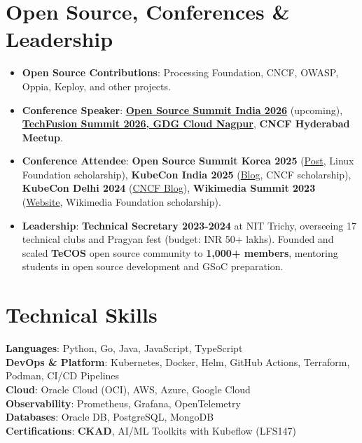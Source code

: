 \documentclass[letterpaper,11pt]{article}
\newcommand{\resumeItem}[1]{
  \item\small{
    {#1 \vspace{-4pt}}
  }
}
\newcommand{\resumeItemListStart}{\begin{itemize}}
\newcommand{\resumeItemListEnd}{\end{itemize}\vspace{-5pt}}
\begin{document}
\section{Open Source, Conferences \& Leadership}
    \resumeItemListStart
    \resumeItem{
        \textbf{Open Source Contributions}: Processing Foundation, CNCF, OWASP, Oppia, Keploy, and other projects.
    }
    \resumeItem{
    \textbf{Conference Speaker}: 
    \href{https://ossindia2026.sched.com/event/2KNF7}{\textbf{Open Source Summit India 2026}} (upcoming),
    \href{https://gdg.community.dev/events/details/google-gdg-cloud-nagpur-presents-techfusion-summit-2026/}{\textbf{TechFusion Summit 2026, GDG Cloud Nagpur}},
    \textbf{CNCF Hyderabad Meetup}.
    }
    \resumeItem{
    \textbf{Conference Attendee}: 
    \textbf{Open Source Summit Korea 2025} (\href{https://www.linkedin.com/posts/akashjaiswal03_opensourcesummit-openssf-opensearchcon-ugcPost-7392580382480658433-a8-J}{Post}, Linux Foundation scholarship), 
    \textbf{KubeCon India 2025} (\href{https://blog.kubeflow.org/kubecon/community/2025/08/23/kubecon-2025-india-kubeflow.html}{Blog}, CNCF scholarship),
    \textbf{KubeCon Delhi 2024} (\href{https://www.cncf.io/blog/2025/03/17/kubecon-cloudnativecon-india-2024-from-dreams-to-reality-journey/}{CNCF Blog}), 
    \textbf{Wikimedia Summit 2023} (\href{https://indicwiki.iiit.ac.in/summit-2023/}{Website}, Wikimedia Foundation scholarship).
    }
    \resumeItem{\textbf{Leadership}: \textbf{Technical Secretary 2023-2024} at NIT Trichy, overseeing 17 technical clubs and Pragyan fest (budget: INR 50+ lakhs). Founded and scaled \textbf{TeCOS} open source community to \textbf{1,000+ members}, mentoring students in open source development and GSoC preparation.}
\resumeItemListEnd


\section{Technical Skills}
 \begin{itemize}[leftmargin=0.15in, label={}]
    \small{\item{
     \textbf{Languages}{: Python, Go, Java, JavaScript, TypeScript} \\
     \textbf{DevOps \& Platform}{: Kubernetes, Docker, Helm, GitHub Actions, Terraform, Podman, CI/CD Pipelines} \\
     \textbf{Cloud}{: Oracle Cloud (OCI), AWS, Azure, Google Cloud} \\
     \textbf{Observability}{: Prometheus, Grafana, OpenTelemetry} \\
     \textbf{Databases}{: Oracle DB, PostgreSQL, MongoDB} \\
     \textbf{Certifications}{: \textbf{CKAD}, AI/ML Toolkits with Kubeflow (LFS147)} \\
    }}
 \end{itemize}
 \vspace{-20pt}
\end{document}
